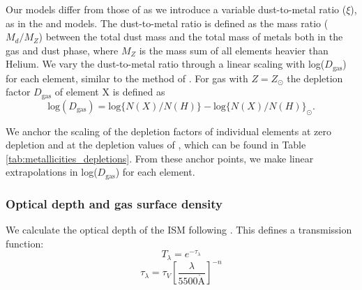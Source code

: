 \documentclass[fleqn,usenatbib]{mnras}
\begin{document}
Our models differ from those of \cite{byler2017} as we introduce a variable dust-to-metal ratio ($\xi$), as in the \cite{charlot2001} and \cite{brinchmann2013} models. The dust-to-metal ratio is defined as the mass ratio ($M_{d}/M_{Z}$) between the total dust mass and the total mass of metals both in the gas and dust phase, where $M_{Z}$ is the mass sum of all elements heavier than Helium. We vary the dust-to-metal ratio through a linear scaling with log($D_{\textrm{gas}}$) for each element,  similar to the method of \cite{jenkins2009}. For gas with $Z = Z_{\odot}$  the depletion factor $D_{\textrm{gas}}$ of element X is defined as 
\begin{equation}
    \textrm{log}(D_{\textrm{gas}})=\textrm{log}\{N(X)/N(H)\} - \textrm{log}\{N(X)/N(H)\}_{\odot}.
\end{equation}

We anchor the scaling of the depletion factors of individual elements at zero depletion and at the depletion values of \cite{dopita2013}, which can be found in Table \ref{tab:metallicities_depletions}. From these anchor points, we make linear extrapolations in log($D_{\textrm{gas}}$) for each element. 

\subsubsection{Optical depth and gas surface density}
We calculate the optical depth of the ISM following \cite{charlot2000}. This defines a transmission function:
\begin{equation}
\label{CH2000_transmission}
    T_{\lambda} = e^{-\tau_{\lambda}}
\end{equation}
\begin{equation}
\label{dust_attenuation}
    \tau_{\lambda} = \tau_{V} \left[ \frac{\lambda}{5500 
\mathring{\mathrm{A}}} \right]^{-n}
\end{equation}
\end{document}
